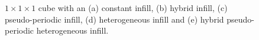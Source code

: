 \begin{figure}[htb]
{\begin{subfigure}[t]{.225\linewidth}
			\caption{}\label{fig:feature}
	\end{subfigure}}
	
	\centering
	\begin{minipage}{.5\textwidth}
		\hfil {}
		\hfil {}
	\end{minipage}%
	\begin{minipage}{.5\textwidth}
	\end{minipage}
	
	\caption{$1\times1\times1$ cube with an (a) constant infill, (b) hybrid infill, (c) pseudo-periodic infill, (d) heterogeneous infill and (e) hybrid pseudo-periodic heterogeneous infill.}
	\label{fig:demo results}
\end{figure}

